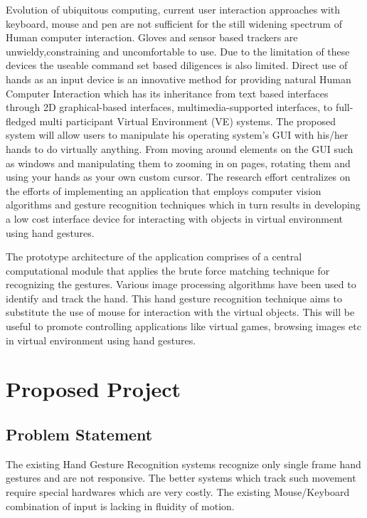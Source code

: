 \documentclass[11pt]{report}
\begin{document}
Evolution of ubiquitous computing, current user interaction approaches with keyboard, mouse and pen are not sufficient for the still widening spectrum of Human computer interaction. Gloves and sensor based trackers are unwieldy,constraining and uncomfortable to use. Due to the limitation of these devices the useable command set based diligences is also limited. Direct use of hands as an input device is an innovative method for providing natural Human Computer Interaction which has its inheritance from text based interfaces through 2D graphical-based interfaces, multimedia-supported interfaces, to full-fledged multi participant Virtual Environment (VE) systems. The proposed system will allow users to manipulate his operating system’s GUI with his/her hands to do virtually anything. From moving around elements on the GUI such as windows and manipulating them to zooming in on pages, rotating them and using your hands as your own custom cursor. The research effort centralizes on the efforts of implementing an application that employs computer vision algorithms and gesture recognition techniques which in turn results in developing a low cost interface device for interacting with objects in virtual environment using hand gestures.

The prototype architecture of the application comprises of a central computational module that applies the brute force matching technique for recognizing the gestures. Various image processing algorithms have been used to identify and track the hand. This hand gesture recognition technique aims to substitute the use of mouse for interaction with the virtual objects. This will be useful to promote controlling applications like virtual games, browsing images etc in virtual environment using hand gestures.

\section{Proposed Project}

\subsection{Problem Statement}

The existing Hand Gesture Recognition systems recognize only single frame hand gestures and are not 
responsive. The better systems which track such movement require special hardwares which are very costly.
The existing Mouse/Keyboard combination of input is lacking in fluidity of motion.
\end{document}
